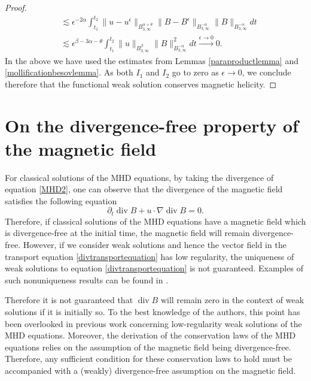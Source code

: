 \documentclass[12pt,a4paper]{article}
\theoremstyle{definition}
\theoremstyle{remark}
\numberwithin{equation}{section}
\DeclareMathOperator{\Div}{div}
\begin{document}
\begin{proof}
\begin{align*}
&\lesssim \epsilon^{-2\alpha} \int_{t_1}^{t_2} \lVert u - u^\epsilon \rVert_{B^{\alpha+\theta}_{3,\infty}} \lVert B - B^\epsilon \rVert_{B^{-\alpha}_{3,\infty}} \lVert B \rVert_{B^{-\alpha}_{3,\infty}} dt \\
&\lesssim \epsilon^{\beta-3\alpha-\theta} \int_{t_1}^{t_2} \lVert u  \rVert_{B^{\beta}_{3,\infty}} \lVert B \rVert_{B^{-\alpha}_{3,\infty}}^2 dt \xrightarrow[]{\epsilon \rightarrow 0} 0. 
\end{align*}
In the above we have used the estimates from Lemmas \ref{paraproductlemma} and \ref{mollificationbesovlemma}. As both $I_1$ and $I_2$ go to zero as $\epsilon \rightarrow 0$, we conclude therefore that the functional weak solution conserves magnetic helicity. 
\end{proof}

\section{On the divergence-free property of the magnetic field} \label{divergencesection}
For classical solutions of the MHD equations, by taking the divergence of equation \eqref{MHD2}, one can observe that the divergence of the magnetic field satisfies the following equation
\begin{equation} \label{divtransportequation}
\partial_t \Div B + u \cdot \nabla \Div B = 0.
\end{equation}
Therefore, if classical solutions of the MHD equations have a magnetic field which is divergence-free at the initial time, the magnetic field will remain divergence-free. However, if we consider weak solutions and hence the vector field in the transport equation \eqref{divtransportequation} has low regularity, the uniqueness of weak solutions to equation \eqref{divtransportequation} is not guaranteed. Examples of such nonuniqueness results can be found in \cite{modena,modena2019}.

Therefore it is not guaranteed that $\Div B$ will remain zero in the context of weak solutions if it is initially so. To the best knowledge of the authors, this point has been overlooked in previous work concerning low-regularity weak solutions of the MHD equations. Moreover, the derivation of the conservation laws of the MHD equations relies on the assumption of the magnetic field being divergence-free. Therefore, any sufficient condition for these conservation laws to hold must be accompanied with a (weakly) divergence-free assumption on the magnetic field. 
\end{document}
